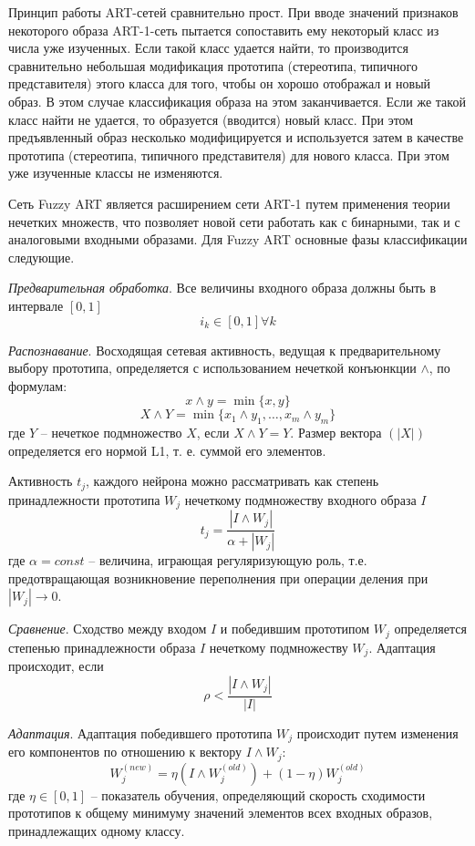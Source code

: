 Принцип работы ART-сетей сравнительно прост. При вводе значений признаков некоторого образа ART-1-сеть пытается сопоставить ему некоторый класс из числа уже изученных. Если такой класс удается найти, то производится сравнительно небольшая модификация прототипа (стереотипа, типичного представителя) этого класса для того, чтобы он хорошо отображал и новый образ. В этом случае классификация образа на этом заканчивается.
Если же такой класс найти не удается, то образуется (вводится) новый класс. При этом предъявленный образ несколько модифицируется и используется затем в качестве прототипа (стереотипа, типичного представителя) для нового класса. При этом уже изученные классы не изменяются. 

Сеть  Fuzzy  ART  является  расширением  сети ART-1  путем  применения  теории  нечетких  множеств, что позволяет новой сети работать как с бинарными, так и с аналоговыми входными образами. Для Fuzzy ART основные фазы классификации 
следующие.

\textit{Предварительная  обработка}.  Все  величины входного образа должны быть в интервале $[0,1]$ 
$$
	i_k \in [0,1] \forall k
$$

\textit{Распознавание}. Восходящая сетевая активность, ведущая  к  предварительному  выбору  прототипа, определяется  с  использованием  нечеткой  конъюнкции $\wedge$, по формулам:
$$
	x \wedge y = \min\{x,y\}
$$
$$
	X \wedge Y = \min\{x_1 \wedge y_1, \ldots, x_m \wedge y_m\}
$$
где $Y$ – нечеткое подмножество $X$, если $X \wedge Y = Y$. Размер вектора $(|X|)$ определяется его нормой L1, т. е. суммой его элементов.

Активность $t_j$, каждого нейрона можно рассматривать как степень принадлежности прототипа $W_j$ нечеткому подмножеству входного образа $I$
$$
	t_j = \frac{|I \wedge W_j|}{\alpha + |W_j|}
$$ 
где $\alpha = const$ – величина, играющая регуляризующую роль, т.е. предотвращающая возникновение переполнения при операции деления при  $|W_j| \to 0$. 

\textit{Сравнение}. Сходство между входом $I$ и победившим прототипом $W_j$ определяется степенью принадлежности образа $I$ нечеткому подмножеству $W_j$. 
Адаптация происходит, если
$$
	\rho < \frac{|I \wedge W_j|}{|I|}
$$ 

\textit{Адаптация}. Адаптация победившего прототипа $W_j$ происходит путем изменения его компонентов по отношению к вектору $I \wedge W_j$:
$$
	W_j^{(new)} = \eta (I \wedge W_j^{(old)}) + (1 - \eta) W_j^{(old)}
$$
где $\eta \in [0,1]$ – показатель обучения, определяющий скорость сходимости прототипов к общему минимуму значений элементов всех входных образов, 
принадлежащих одному классу.

